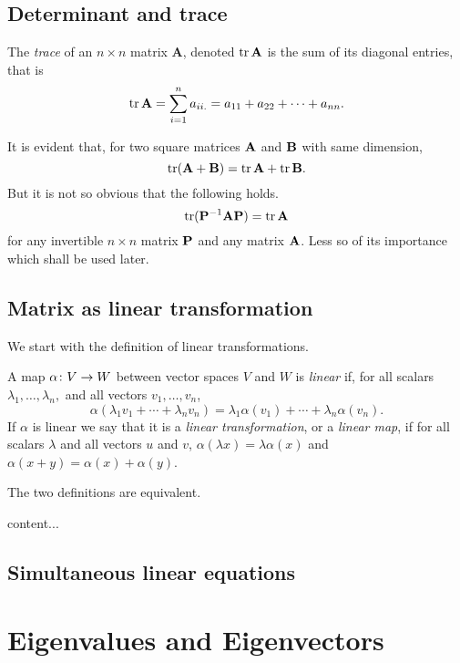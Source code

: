 \documentclass[main.tex]{subfiles}
\begin{document}
		\subsection{Determinant and trace}
			\begin{theorem}
				The \textit{trace}  of an $n \times n$ matrix $\mathbf{A}$, denoted $\operatorname{tr} \mathbf{A}$ is the sum of its diagonal entries, that is
				\begin{equation*}
					\operatorname{tr} \mathbf{A} = \sum_{i = 1}^{n} a_{ii.} = a_{11} + a_{22} + \cdots + a_{nn}.
				\end{equation*}
			\end{theorem}
			It is evident that, for two square matrices $\mathbf{A}$ and $\mathbf{B}$ with same dimension,
			\begin{equation*}
				\operatorname{tr}(\mathbf{A + B}) = \operatorname{tr}\mathbf{A} + \operatorname{tr}\mathbf{B}.
			\end{equation*}
			But it is not so obvious that the following holds.
			\begin{equation*}
				\operatorname{tr}(\mathbf{P}^{-1}\mathbf{AP}) = \operatorname{tr}\mathbf{A}
			\end{equation*}
			for any invertible $n\times n$ matrix $\mathbf{P}$ and any matrix $\mathbf{A}$. Less so of its importance which shall be used later.
			
		\subsection{Matrix as linear transformation}
			We start with the definition of linear transformations.
			\begin{definition}
				A map $\alpha \colon V \rightarrow W$ between vector spaces $V$ and $W$ is \textit{linear} if, for all scalars $\lambda_1, \ldots, \lambda_n,$ and all vectors $v_1, \ldots, v_n$,
				\begin{equation*}
					\alpha\left(\lambda_1v_1 + \cdots + \lambda_n v_n\right) = \lambda_1\alpha(v_1) + \cdots + \lambda_n\alpha(v_n).
				\end{equation*}
			If $\alpha$ is linear we say that it is a \textit{linear transformation}, or a \textit{linear map}, if for all scalars $\lambda$ and all vectors $u$ and $v$, $\alpha(\lambda x) = \lambda\alpha(x)$ and $\alpha( x + y) = \alpha (x) + \alpha(y)$.
			\end{definition}
		The two definitions are equivalent.
			\begin{theorem}[Rank-nullity theorem]
				content...
			\end{theorem}
		
		\subsection{Simultaneous linear equations}
		
		\section{Eigenvalues and Eigenvectors}
\end{document}
